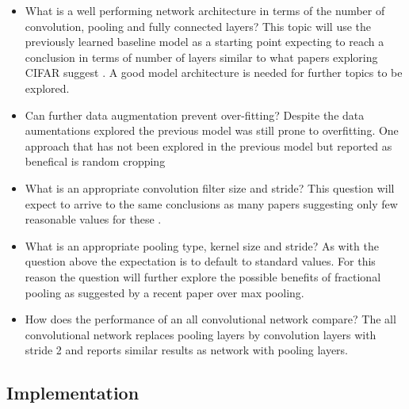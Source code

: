 \documentclass[12pt]{article}
\begin{document}
\begin{itemize}
\item What is a well performing network architecture in terms of the number of convolution, pooling and fully connected layers? This  topic will use the previously learned baseline model as a starting point expecting to reach a conclusion in terms of number of layers similar to what papers exploring CIFAR suggest \cite{inspiration}. A good model architecture is needed for further topics to be explored.
\item Can further data augmentation prevent over-fitting? Despite the data aumentations explored the previous model was still prone to overfitting. One approach that has not been explored in the previous model but reported as benefical is random cropping\cite{kernel}\cite{crop}
\item What is an appropriate convolution filter size and stride? This question will expect to arrive to the same conclusions as many papers suggesting only few reasonable values for these \cite{inspiration}\cite{bestprac}\cite{frac}.
\item What is an appropriate pooling type, kernel size and stride? As with the question above the expectation is to default to standard values. For this reason the question will further explore the possible benefits of fractional pooling as suggested by a recent paper\cite{frac} over max pooling.
\item How does the performance of an all convolutional network\cite{allconv} compare? The all convolutional network replaces pooling layers by convolution layers with stride 2 and reports similar results as network with pooling layers. 
\end{itemize}

\subsection*{Implementation}
\end{document}

